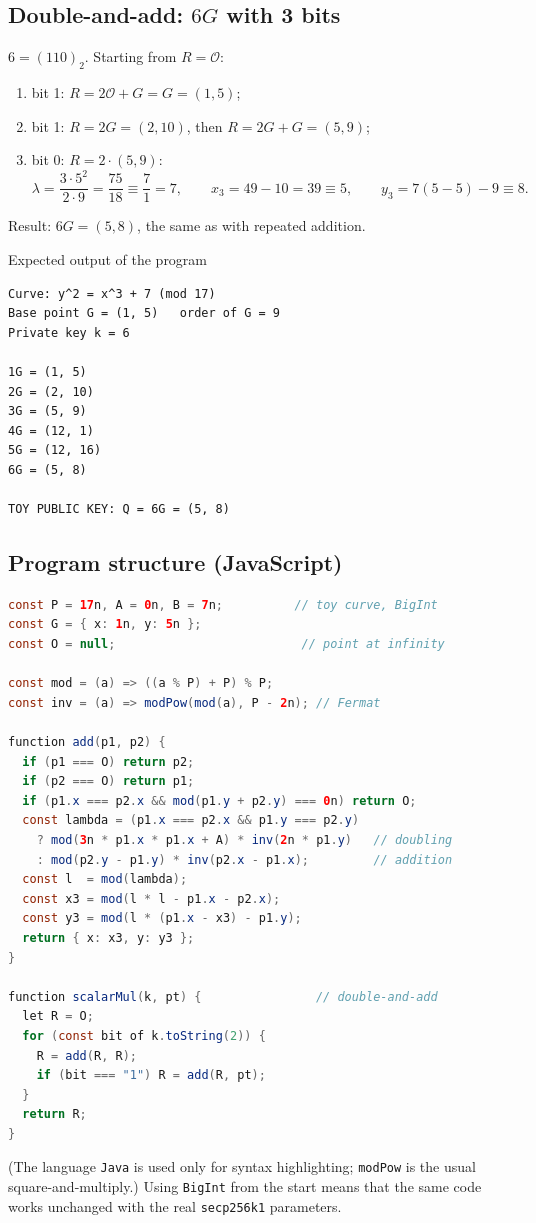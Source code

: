 \subsection{Double-and-add: $6G$ with 3 bits}

$6 = (110)_2$. Starting from $R = \mathcal{O}$:
\begin{enumerate}
  \item bit 1: $R = 2\mathcal{O} + G = G = (1,5)$;
  \item bit 1: $R = 2G = (2,10)$, then $R = 2G + G = (5,9)$;
  \item bit 0: $R = 2 \cdot (5,9)$:
  \[
    \lambda = \frac{3 \cdot 5^2}{2 \cdot 9} = \frac{75}{18} \equiv \frac{7}{1} = 7, \qquad
    x_3 = 49 - 10 = 39 \equiv 5, \qquad
    y_3 = 7(5 - 5) - 9 \equiv 8 .
  \]
\end{enumerate}
Result: $6G = (5, 8)$, the same as with repeated addition. \checkmark

\begin{framedex}{Expected output of the program}
\begin{lstlisting}[numbers=none]
Curve: y^2 = x^3 + 7 (mod 17)
Base point G = (1, 5)   order of G = 9
Private key k = 6

1G = (1, 5)
2G = (2, 10)
3G = (5, 9)
4G = (12, 1)
5G = (12, 16)
6G = (5, 8)

TOY PUBLIC KEY: Q = 6G = (5, 8)\end{lstlisting}
\end{framedex}

\subsection{Program structure (JavaScript)}

\begin{lstlisting}[language=Java]
const P = 17n, A = 0n, B = 7n;          // toy curve, BigInt
const G = { x: 1n, y: 5n };
const O = null;                          // point at infinity

const mod = (a) => ((a % P) + P) % P;
const inv = (a) => modPow(mod(a), P - 2n); // Fermat

function add(p1, p2) {
  if (p1 === O) return p2;
  if (p2 === O) return p1;
  if (p1.x === p2.x && mod(p1.y + p2.y) === 0n) return O;
  const lambda = (p1.x === p2.x && p1.y === p2.y)
    ? mod(3n * p1.x * p1.x + A) * inv(2n * p1.y)   // doubling
    : mod(p2.y - p1.y) * inv(p2.x - p1.x);         // addition
  const l  = mod(lambda);
  const x3 = mod(l * l - p1.x - p2.x);
  const y3 = mod(l * (p1.x - x3) - p1.y);
  return { x: x3, y: y3 };
}

function scalarMul(k, pt) {                // double-and-add
  let R = O;
  for (const bit of k.toString(2)) {
    R = add(R, R);
    if (bit === "1") R = add(R, pt);
  }
  return R;
}\end{lstlisting}
(The language \texttt{Java} is used only for syntax highlighting; \texttt{modPow} is the usual square-and-multiply.) Using \texttt{BigInt} from the start means that the same code works unchanged with the real \texttt{secp256k1} parameters.

